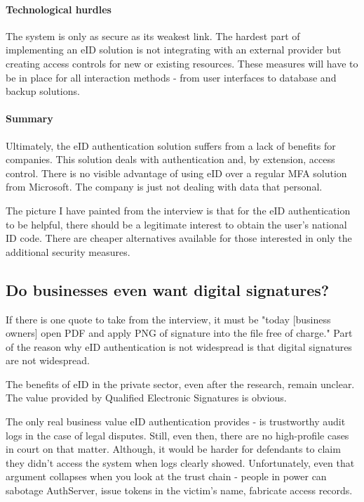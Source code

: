 \paragraph{Technological hurdles}

The system is only as secure as its weakest link. The hardest part of implementing an eID solution is not integrating with an external provider but creating access controls for new or existing resources. These measures will have to be in place for all interaction methods - from user interfaces to database and backup solutions.

\paragraph{Summary}

Ultimately, the eID authentication solution suffers from a lack of benefits for companies. This solution deals with authentication and, by extension, access control. There is no visible advantage of using eID over a regular MFA solution from Microsoft. The company is just not dealing with data that personal.

The picture I have painted from the interview is that for the eID authentication to be helpful, there should be a legitimate interest to obtain the user's national ID code. There are cheaper alternatives available for those interested in only the additional security measures.

\subsection{Do businesses even want digital signatures?}

If there is one quote to take from the interview, it must be "today [business owners] open PDF and apply PNG of signature into the file free of charge." Part of the reason why eID authentication is not widespread is that digital signatures are not widespread.

The benefits of eID in the private sector, even after the research, remain unclear. The value provided by Qualified Electronic Signatures is obvious.

The only real business value eID authentication provides - is trustworthy audit logs in the case of legal disputes. Still, even then, there are no high-profile cases in court on that matter. Although, it would be harder for defendants to claim they didn't access the system when logs clearly showed. Unfortunately, even that argument collapses when you look at the trust chain - people in power can sabotage AuthServer, issue tokens in the victim's name, fabricate access records.

